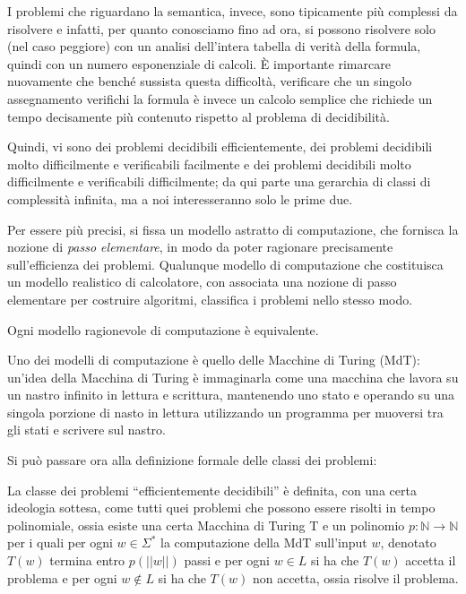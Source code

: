 I problemi che riguardano la semantica, invece, sono tipicamente più complessi
da risolvere e infatti, per quanto conosciamo fino ad ora, si possono risolvere 
solo (nel caso peggiore) con un analisi dell'intera tabella di verità della 
formula, quindi con un numero esponenziale di calcoli. \`E importante rimarcare 
nuovamente che benché sussista questa difficoltà, verificare che 
un singolo assegnamento verifichi la formula è invece un calcolo semplice 
che richiede un tempo decisamente più contenuto rispetto al problema di 
decidibilità.

Quindi, vi sono dei problemi decidibili efficientemente, 
dei problemi decidibili molto difficilmente e verificabili facilmente 
e dei problemi decidibili molto difficilmente e verificabili difficilmente; 
da qui parte una gerarchia di classi di complessità infinita, ma a noi interesseranno 
solo le prime due. 
 
Per essere più precisi, si fissa un modello astratto di computazione, che fornisca 
la nozione di \textit{passo elementare}, in modo da poter ragionare precisamente 
sull'efficienza dei problemi. 
Qualunque modello di computazione che costituisca un modello realistico 
di calcolatore, con associata una nozione di passo elementare per costruire 
algoritmi, classifica i problemi nello stesso modo. 

\begin{oss}
  Ogni modello ragionevole di computazione è equivalente.
\end{oss}

Uno dei modelli di computazione è quello delle Macchine di Turing (MdT): un'idea 
della Macchina di Turing è immaginarla come una macchina che lavora su un 
nastro infinito in lettura e scrittura, mantenendo uno stato e operando su 
una singola porzione di nasto in lettura utilizzando un programma per 
muoversi tra gli stati e scrivere sul nastro. 

Si può passare ora alla definizione formale delle classi dei problemi: 
\begin{defi}
  La classe dei problemi ``efficientemente decidibili'' è definita, con una 
  certa ideologia sottesa, come tutti quei problemi che possono essere 
  risolti in tempo polinomiale, ossia esiste una certa Macchina di Turing T 
  e un polinomio $p: \mathbb{N}\rightarrow \mathbb{N}$ per i quali per ogni 
  $w \in \Sigma^*$  la computazione della MdT sull'input $w$, 
  denotato $T(w)$ termina entro $p(||w||)$ passi e per ogni $w \in L$ si 
  ha che $T(w)$ accetta il problema e per ogni $w \notin L$  si ha 
  che $T(w)$ non accetta, ossia risolve il problema.
\end{defi}

